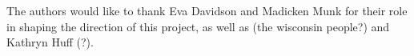 \documentclass{anstrans}
\renewcommand{\vec}[1]{\bm{#1}} %
\newcommand{\vd}{\bm{\cdot}} %
\newcommand{\grad}{\vec{\nabla}} %
\newcommand{\ud}{\mathop{}\!\mathrm{d}} %
\begin{document}
The authors would like to thank Eva Davidson and Madicken Munk for their role
in shaping the direction of this project, as well as (the wisconsin people?) and Kathryn Huff (?).



\printglossary[type=\acronymtype]
\printglossary





\end{document}
